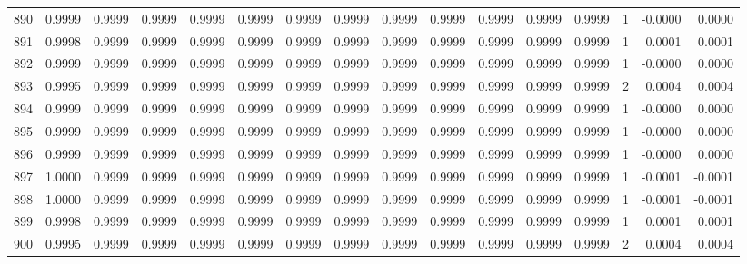\begin{tabular}{lrrrrrrrrrrrrrrr}
890 &      0.9999 &  0.9999 &  0.9999 &  0.9999 &  0.9999 &  0.9999 &  0.9999 &  0.9999 &  0.9999 &  0.9999 &   0.9999 &     0.9999 &      1 &                   -0.0000 &                     0.0000 \\
891 &      0.9998 &  0.9999 &  0.9999 &  0.9999 &  0.9999 &  0.9999 &  0.9999 &  0.9999 &  0.9999 &  0.9999 &   0.9999 &     0.9999 &      1 &                    0.0001 &                     0.0001 \\
892 &      0.9999 &  0.9999 &  0.9999 &  0.9999 &  0.9999 &  0.9999 &  0.9999 &  0.9999 &  0.9999 &  0.9999 &   0.9999 &     0.9999 &      1 &                   -0.0000 &                     0.0000 \\
893 &      0.9995 &  0.9999 &  0.9999 &  0.9999 &  0.9999 &  0.9999 &  0.9999 &  0.9999 &  0.9999 &  0.9999 &   0.9999 &     0.9999 &      2 &                    0.0004 &                     0.0004 \\
894 &      0.9999 &  0.9999 &  0.9999 &  0.9999 &  0.9999 &  0.9999 &  0.9999 &  0.9999 &  0.9999 &  0.9999 &   0.9999 &     0.9999 &      1 &                   -0.0000 &                     0.0000 \\
895 &      0.9999 &  0.9999 &  0.9999 &  0.9999 &  0.9999 &  0.9999 &  0.9999 &  0.9999 &  0.9999 &  0.9999 &   0.9999 &     0.9999 &      1 &                   -0.0000 &                     0.0000 \\
896 &      0.9999 &  0.9999 &  0.9999 &  0.9999 &  0.9999 &  0.9999 &  0.9999 &  0.9999 &  0.9999 &  0.9999 &   0.9999 &     0.9999 &      1 &                   -0.0000 &                     0.0000 \\
897 &      1.0000 &  0.9999 &  0.9999 &  0.9999 &  0.9999 &  0.9999 &  0.9999 &  0.9999 &  0.9999 &  0.9999 &   0.9999 &     0.9999 &      1 &                   -0.0001 &                    -0.0001 \\
898 &      1.0000 &  0.9999 &  0.9999 &  0.9999 &  0.9999 &  0.9999 &  0.9999 &  0.9999 &  0.9999 &  0.9999 &   0.9999 &     0.9999 &      1 &                   -0.0001 &                    -0.0001 \\
899 &      0.9998 &  0.9999 &  0.9999 &  0.9999 &  0.9999 &  0.9999 &  0.9999 &  0.9999 &  0.9999 &  0.9999 &   0.9999 &     0.9999 &      1 &                    0.0001 &                     0.0001 \\
900 &      0.9995 &  0.9999 &  0.9999 &  0.9999 &  0.9999 &  0.9999 &  0.9999 &  0.9999 &  0.9999 &  0.9999 &   0.9999 &     0.9999 &      2 &                    0.0004 &                     0.0004 \\

\end{tabular}
